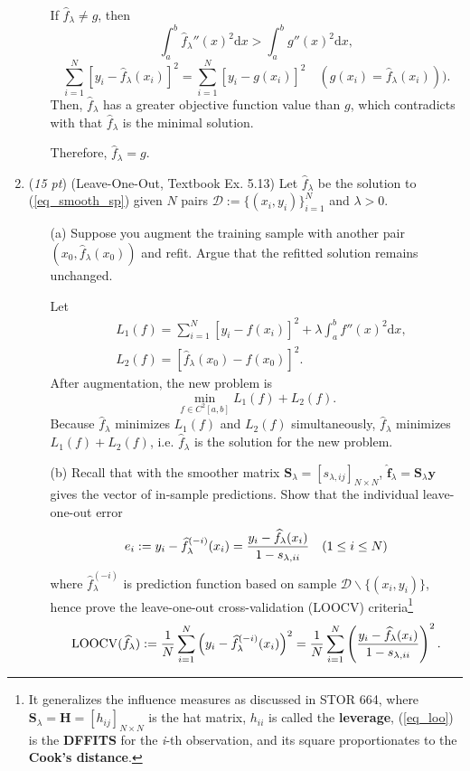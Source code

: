 \documentclass[10pt]{article}
\theoremstyle{definition}
\theoremstyle{remark}
\newcommand{\bbf}{\bm{f}}
\newcommand{\by}{\bm{y}}
\newcommand{\Hb}{\mathbf{H}}
\newcommand{\Sbb}{\mathbf{S}}
\newcommand{\cD}{\mathcal{D}}
\newcommand{\rd}{\mathrm{d}}		%
\newcommand{\LOOCV}{\mathrm{LOOCV}}	%
\begin{document}
\begin{enumerate}
\begin{itemize}
		If $\widehat{f}_{\lambda} \ne g$, then \[ \int_{a}^{b}\widehat{f}_{\lambda}''(x)^{2}\rd x > \int_{a}^{b} g''(x)^{2}\rd x, \]
		\[ \sum_{i=1}^{N}[y_{i}-\widehat{f}_{\lambda}(x_{i})]^{2} = \sum_{i=1}^{N}[y_{i}-g(x_{i})]^{2} \quad (g(x_i) = \widehat{f}_{\lambda}(x_{i})) ).\]
		Then, $\widehat{f}_{\lambda}$ has a greater objective function value than $g$, which contradicts with that $\widehat{f}_{\lambda}$ is the minimal solution. 
		
		Therefore, $\widehat{f}_{\lambda} = g$.
		
	\end{itemize}
	
	\item (\textit{15 pt}) (Leave-One-Out, Textbook Ex. 5.13) Let $ \widehat{f}_{\lambda} $ be the solution to (\ref{eq_smooth_sp}) given $ N $ pairs $ \cD := \{ (x_{i},y_{i}) \}_{i=1}^{N} $ and $ \lambda > 0 $. 
	\begin{itemize}
		\item [(a)] Suppose you augment the training sample with another pair $ \left( x_{0},\widehat{f}_{\lambda}(x_{0}) \right) $ and refit. Argue that the refitted solution remains unchanged.
		
		Let 
		\begin{align*}
		    & L_1(f) = \sum_{i=1}^{N}[y_{i}-f(x_{i})]^{2} + \lambda \int_{a}^{b}f''(x)^{2}\rd x, \\
		    & L_2(f) = [\widehat{f}_{\lambda}(x_{0})-f(x_{0})]^{2}.
		\end{align*}
		After augmentation, the new problem is 
		\[\min_{f \in C^{2}[a,b]} L_1(f) + L_2(f). \]
		Because $ \widehat{f}_{\lambda} $ minimizes $L_1(f)$ and $L_2(f)$ simultaneously, $ \widehat{f}_{\lambda} $ minimizes $L_1(f) + L_2(f)$, i.e. $\widehat{f}_{\lambda}$ is the solution for the new problem.
		
		
		
		\item [(b)] Recall that with the smoother matrix $ \Sbb_{\lambda} = [s_{\lambda,ij}]_{N\times N} $, $ \widehat{\bbf}_{\lambda} = \Sbb_{\lambda}\by $ gives the vector of in-sample predictions. Show that the individual leave-one-out error
		\begin{align}
		e_{i} := y_{i} - \widehat{f}^{(-i)}_{\lambda}(x_{i}) = {y_{i} - \widehat{f}_{\lambda}(x_{i}) \over 1 - s_{\lambda,ii}} \quad(1 \le i \le N)\label{eq_loo}
		\end{align}
		where $ \widehat{f}^{(-i)}_{\lambda} $ is prediction function based on sample $ \cD \backslash \{ (x_{i},y_{i}) \} $, hence prove the leave-one-out cross-validation (LOOCV) criteria\footnote{It generalizes the influence measures as discussed in STOR 664, where $ \Sbb_{\lambda} = \Hb = [h_{ij}]_{N\times N} $ is the hat matrix, $ h_{ii} $ is called the \textbf{leverage}, (\ref{eq_loo}) is the \textbf{DFFITS} for the \textit{i}-th observation, and its square proportionates to the \textbf{Cook's distance}.}
		\[ \LOOCV(\widehat{f}_{\lambda}) := {1 \over N}\sum_{i=1}^{N}\left( y_{i} - \widehat{f}^{(-i)}_{\lambda}(x_{i}) \right)^{2} = {1 \over N}\sum_{i=1}^{N}\left( {y_{i} - \widehat{f}_{\lambda}(x_{i}) \over 1 - s_{\lambda,ii}} \right)^{2}. \]
		

\end{itemize}
\end{enumerate}
\end{document}
